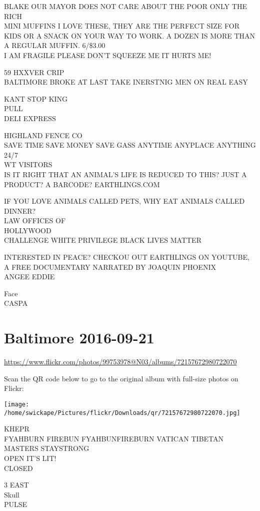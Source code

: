 \documentclass[10pt,letterpaper]{article}
\begin{document}
BLAKE OUR MAYOR DOES NOT CARE ABOUT THE POOR ONLY THE RICH\\
MINI MUFFINS I LOVE THESE, THEY ARE THE PERFECT SIZE FOR KIDS OR A SNACK ON YOUR WAY TO WORK.  A DOZEN IS MORE THAN A REGULAR MUFFIN.  6/\$3.00\\
I AM FRAGILE PLEASE DON'T SQUEEZE ME IT HURTS ME!

59 HXXVER CRIP\\
BALTIMORE BROKE AT LAST TAKE INERSTNIG MEN ON REAL EASY

KANT STOP KING\\
PULL\\
DELI EXPRESS

HIGHLAND FENCE CO\\
SAVE TIME SAVE MONEY SAVE GASS ANYTIME ANYPLACE ANYTHING 24/7\\
WT VISITORS\\
IS IT RIGHT THAT AN ANIMAL'S LIFE IS REDUCED TO THIS?  JUST A PRODUCT?  A BARCODE?  EARTHLINGS.COM

IF YOU LOVE ANIMALS CALLED PETS, WHY EAT ANIMALS CALLED DINNER?\\
LAW OFFICES OF\\
HOLLYWOOD\\
CHALLENGE WHITE PRIVILEGE BLACK LIVES MATTER

INTERESTED IN PEACE?  CHECKOU OUT EARTHLINGS ON YOUTUBE, A FREE DOCUMENTARY NARRATED BY JOAQUIN PHOENIX\\
ANGEE EDDIE

Face\\
CASPA
\pagebreak

\section*{Baltimore 2016-09-21}

\url{https://www.flickr.com/photos/99753978@N03/albums/72157672980722070}

Scan the QR code below to go to the original album with full-size photos on Flickr:

\texttt{[image: /home/swickape/Pictures/flickr/Downloads/qr/72157672980722070.jpg]}
\pagebreak

KHEPR\\
FYAHBURN FIREBUN FYAHBUNFIREBURN VATICAN TIBETAN MASTERS STAYSTRONG\\
OPEN IT'S LIT!\\
CLOSED

3 EAST\\
Skull\\
PULSE
\end{document}
